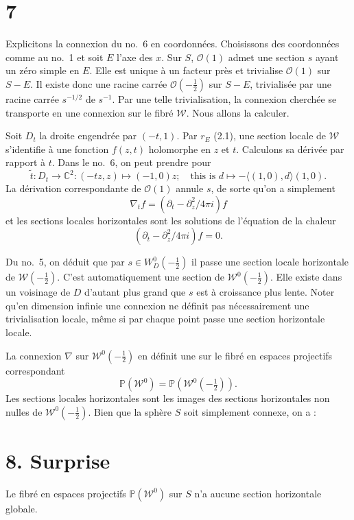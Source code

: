 \documentclass[11pt]{article}
\newcommand{\C}{\mathbb C}
\newcommand{\cO}{\mathcal O}
\newcommand{\cW}{\mathcal W}
\newcommand{\half}{\tfrac12}
\begin{document}
\section*{7}
Explicitons la connexion du no.~6 en coordonnées. Choisissons des coordonnées comme au no.~1 et soit $E$ l'axe des $x$. Sur $S$, $\cO(1)$ admet une section $s$ ayant un zéro simple en $E$. Elle est unique à un facteur près et trivialise $\cO(1)$ sur $S-E$. Il existe donc une racine carrée $\cO(-\half)$ sur $S-E$, trivialisée par une racine carrée $s^{-1/2}$ de $s^{-1}$. Par une telle trivialisation, la connexion cherchée se transporte en une connexion sur le fibré $\cW$. Nous allons la calculer.

Soit $D_t$ la droite engendrée par $(-t,1)$. Par $r_E$ (2.1), une section locale de $\cW$ s'identifie à une fonction $f(z,t)$ holomorphe en $z$ et $t$. Calculons sa dérivée par rapport à $t$. Dans le no.~6, on peut prendre pour
\[
\tilde t:D_t\to\C^2:(-tz,z)\mapsto(-1,0)z;\quad\text{this is }d\mapsto-\langle(1,0),d\rangle(1,0).
\]
La dérivation correspondante de $\cO(1)$ annule $s$, de sorte qu'on a simplement
\begin{equation}\tag{7.1}
\nabla_t f=(\partial_t-\partial_z^2/4\pi i)f
\end{equation}
et les sections locales horizontales sont les solutions de l'équation de la chaleur
\begin{equation}\tag{7.2}
(\partial_t-\partial_z^2/4\pi i)f=0.
\end{equation}

Du no.~5, on déduit que par $s\in W_D^0(-\half)$ il passe une section locale horizontale de $\cW(-\half)$. C'est automatiquement une section de $\cW^0(-\half)$. Elle existe dans un voisinage de $D$ d'autant plus grand que $s$ est à croissance plus lente. Noter qu'en dimension infinie une connexion ne définit pas nécessairement une trivialisation locale, même si par chaque point passe une section horizontale locale.

La connexion $\nabla$ sur $\cW^0(-\half)$ en définit une sur le fibré en espaces projectifs correspondant
\[
\mathbb P(\cW^0)=\mathbb P(\cW^0(-\half)).
\]
Les sections locales horizontales sont les images des sections horizontales non nulles de $\cW^0(-\half)$. Bien que la sphère $S$ soit simplement connexe, on a :

\section*{8. Surprise}
Le fibré en espaces projectifs $\mathbb P(\cW^0)$ sur $S$ n'a aucune section horizontale globale.
\end{document}
